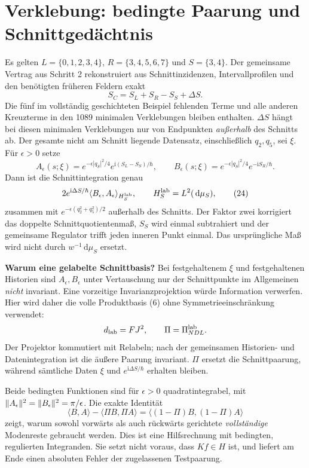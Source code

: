 \documentclass[10pt,a4paper]{article}
\newcommand{\dd}{\,\mathrm d}\newcommand{\ii}{\mathrm i}\newcommand{\R}{\mathbb R}
\begin{document}
\section{Verklebung: bedingte Paarung und Schnittgedächtnis}
Es gelten $L=\{0,1,2,3,4\}$, $R=\{3,4,5,6,7\}$ und $S=\{3,4\}$.
Der gemeinsame Vertrag aus Schritt 2 rekonstruiert aus Schnittinzidenzen,
Intervallprofilen und den benötigten früheren Feldern exakt
\[
 S_C=S_L+S_R-S_S+\Delta S.                                 \tag{22}
\]
Die fünf im vollständig geschichteten Beispiel fehlenden Terme und alle
anderen Kreuzterme in den 1089 minimalen Verklebungen bleiben enthalten.
$\Delta S$ hängt bei diesen minimalen Verklebungen nur von Endpunkten
\emph{außerhalb} des Schnitts ab. Der gesamte nicht am Schnitt liegende
Datensatz, einschließlich $q_2,q_5$, sei $\xi$. Für $\epsilon>0$ setze
\[
 A_\epsilon(s;\xi)=e^{-\epsilon|q_S|^2/4}
                    e^{\ii(S_L-S_S)/\hbar},\qquad
 B_\epsilon(s;\xi)=e^{-\epsilon|q_S|^2/4}
                    e^{-\ii S_R/\hbar}.                       \tag{23}
\]
Dann ist die Schnittintegration genau
\[
 2e^{\ii\Delta S/\hbar}\langle B_\epsilon,A_\epsilon\rangle_{H_S^{\rm lab}},
 \qquad H_S^{\rm lab}=L^2(\dd\mu_S),                        \tag{24}
\]
zusammen mit $e^{-\epsilon(q_2^2+q_5^2)/2}$ außerhalb des Schnitts.
Der Faktor zwei korrigiert das doppelte Schnittquotientenmaß, $S_S$ wird
einmal subtrahiert und der gemeinsame Regulator trifft jeden inneren Punkt
einmal. Das ursprüngliche Maß wird nicht durch $w^{-1}\dd\mu_S$ ersetzt.

\textbf{Warum eine gelabelte Schnittbasis?} Bei festgehaltenem $\xi$ und
festgehaltenen Historien sind $A_\epsilon,B_\epsilon$ unter Vertauschung
nur der Schnittpunkte im Allgemeinen \emph{nicht} invariant. Eine vorzeitige
Invarianzprojektion würde Information verwerfen. Hier wird daher die volle
Produktbasis (6) ohne Symmetrieeinschränkung verwendet:
\[
 d_{\rm lab}=FJ^2,\qquad \Pi=\Pi_{N D L}^{\rm lab}.
\]
Der Projektor kommutiert mit Relabeln; nach der gemeinsamen Historien- und
Datenintegration ist die äußere Paarung invariant. $\Pi$ ersetzt die
Schnittpaarung, während sämtliche Daten $\xi$ und $e^{\ii\Delta S/\hbar}$
erhalten bleiben.

Beide bedingten Funktionen sind für $\epsilon>0$ quadratintegrabel, mit
$\lVert A_\epsilon\rVert^2=\lVert B_\epsilon\rVert^2=\pi/\epsilon$. Die exakte Identität
\[
 \langle B,A\rangle-\langle\Pi B,\Pi A\rangle
   =\langle(1-\Pi)B,(1-\Pi)A\rangle                       \tag{25}
\]
zeigt, warum sowohl vorwärts als auch rückwärts gerichtete \emph{vollständige}
Modenreste gebraucht werden. Dies ist eine Hilfsrechnung mit bedingten,
regulierten Integranden. Sie setzt nicht voraus, dass $Kf\in H$ ist, und
liefert am Ende einen absoluten Fehler der zugelassenen Testpaarung.
\newpage
\end{document}
